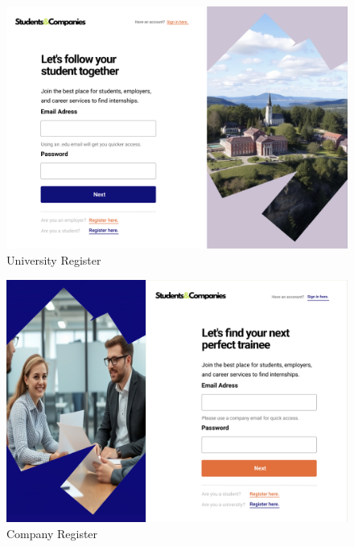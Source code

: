 \documentclass{article}
\begin{document}
\begin{figure}[H]
    \centering
    \includegraphics[scale = 0.40]{figures/UserInterfaces/General/UniCareerRegister.png}
    \caption{University Register}
     \centering
\end{figure}
\begin{figure}[H]
    \centering
    \includegraphics[scale = 0.40]{figures/UserInterfaces/General/EmployerRegister.png}
    \caption{Company Register}
     \centering
\end{figure}
\end{document}
